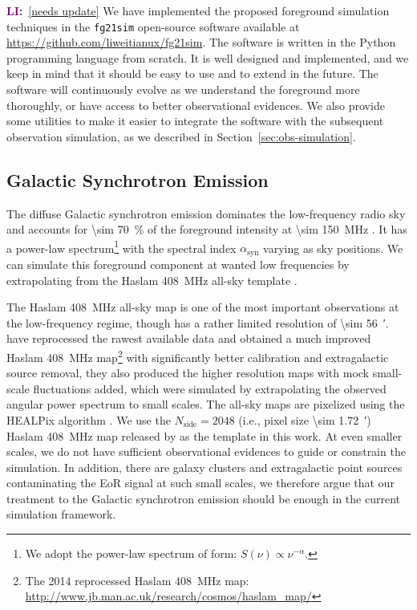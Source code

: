 \documentclass[modern]{aastex61}
\newcommand{\R}[1]{\mathrm{#1}}
\newcommand{\LI}[1]{\textcolor{purple}{\textbf{LI:}}~\uline{#1}}
\begin{document}
\LI{[needs update]}
We have implemented the proposed foreground simulation techniques in the
\texttt{fg21sim} open-source software available at
\url{https://github.com/liweitianux/fg21sim}.
The software is written in the Python programming language from scratch.
It is well designed and implemented, and we keep in mind that it should
be easy to use and to extend in the future.
The software will continuously evolve as we understand the foreground
more thoroughly, or have access to better observational evidences.
We also provide some utilities to make it easier to integrate the
software with the subsequent observation simulation, as we described
in Section~\ref{sec:obs-simulation}.


\subsection{Galactic Synchrotron Emission}
\label{sec:fg-gsync}

The diffuse Galactic synchrotron emission dominates the low-frequency
radio sky and accounts for \SI{\sim 70}{\percent} of the foreground
intensity at \SI{\sim 150}{\MHz} \citep{shaver1999}.
It has a power-law spectrum\footnote{We adopt the power-law
  spectrum of form: $S(\nu) \propto \nu^{-\alpha}$.}
with the spectral index $\alpha_{\R{syn}}$ varying as sky positions.
We can simulate this foreground component at wanted low frequencies
by extrapolating from the Haslam \SI{408}{\MHz} all-sky template
\citep{haslam1982}.

The Haslam \SI{408}{\MHz} all-sky map is one of the most important
observations at the low-frequency regime, though has a rather limited
resolution of \SI{\sim 56}{\arcmin}.
\citet{remazeilles2015} have reprocessed the rawest available data
and obtained a much improved Haslam \SI{408}{\MHz} map\footnote{%
  The 2014 reprocessed Haslam \SI{408}{\MHz} map:
  \url{http://www.jb.man.ac.uk/research/cosmos/haslam_map/}}
with significantly better calibration and extragalactic source removal,
they also produced the higher resolution maps with mock small-scale
fluctuations added, which were simulated by extrapolating the observed
angular power spectrum to small scales.
The all-sky maps are pixelized using the HEALPix algorithm \citep{gorski2005}.
We use the $N_{\R{side}} = 2048$ (i.e., pixel size \SI{\sim 1.72}{\arcmin})
Haslam \SI{408}{\MHz} map released by \citet{remazeilles2015} as the
template in this work.
At even smaller scales, we do not have sufficient observational
evidences to guide or constrain the simulation.  In addition, there
are galaxy clusters and extragalactic point sources contaminating
the EoR signal at such small scales, we therefore argue that our
treatment to the Galactic synchrotron emission should be enough in
the current simulation framework.
\end{document}
